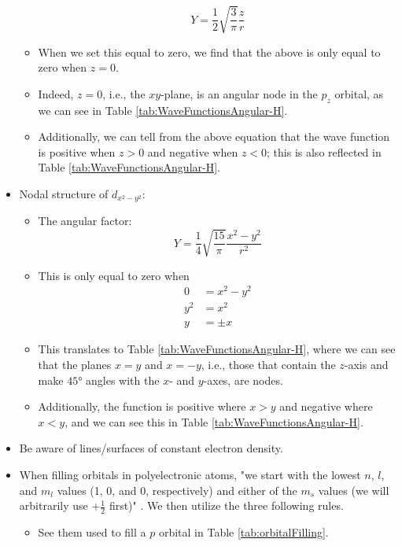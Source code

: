 \documentclass[../main.tex]{subfiles}
\begin{document}
\begin{itemize}
\begin{itemize}
\begin{equation*}
            Y = \frac{1}{2}\sqrt{\frac{3}{\pi}}\frac{z}{r}
        \end{equation*}
        \item When we set this equal to zero, we find that the above is only equal to zero when $z=0$.
        \item Indeed, $z=0$, i.e., the $xy$-plane, is an angular node in the $p_z$ orbital, as we can see in Table \ref{tab:WaveFunctionsAngular-H}.
        \item Additionally, we can tell from the above equation that the wave function is positive when $z>0$ and negative when $z<0$; this is also reflected in Table \ref{tab:WaveFunctionsAngular-H}.
    \end{itemize}
    \item Nodal structure of $d_{x^2-y^2}$:
    \begin{itemize}
        \item The angular factor:
        \begin{equation*}
            Y = \frac{1}{4}\sqrt{\frac{15}{\pi}}\frac{x^2-y^2}{r^2}
        \end{equation*}
        \item This is only equal to zero when
        \begin{align*}
            0 &= x^2-y^2\\
            y^2 &= x^2\\
            y &= \pm x
        \end{align*}
        \item This translates to Table \ref{tab:WaveFunctionsAngular-H}, where we can see that the planes $x=y$ and $x=-y$, i.e., those that contain the $z$-axis and make $\ang{45}$ angles with the $x$- and $y$-axes, are nodes.
        \item Additionally, the function is positive where $x>y$ and negative where $x<y$, and we can see this in Table \ref{tab:WaveFunctionsAngular-H}.
    \end{itemize}
    \item Be aware of lines/surfaces of constant electron density.
    \item When filling orbitals in polyelectronic atoms, "we start with the lowest $n$, $l$, and $m_l$ values (1, 0, and 0, respectively) and either of the $m_s$ values (we will arbitrarily use $+\frac{1}{2}$ first)" \parencite[26]{bib:MiesslerFischerTarr}. We then utilize the three following rules.
    \begin{itemize}
        \item See them used to fill a $p$ orbital in Table \ref{tab:orbitalFilling}.

\end{itemize}
\end{itemize}
\end{document}
